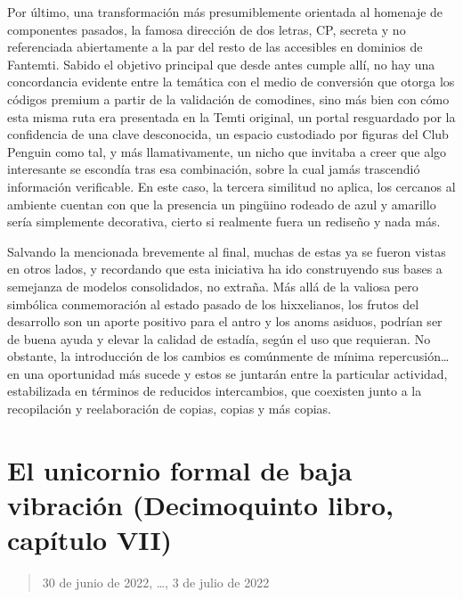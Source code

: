 \documentclass[
]{book}
\begin{document}
Por último, una transformación más presumiblemente orientada al homenaje de componentes pasados, la famosa dirección de dos letras, CP, secreta y no referenciada abiertamente a la par del resto de las accesibles en dominios de Fantemti. Sabido el objetivo principal que desde antes cumple allí, no hay una concordancia evidente entre la temática con el medio de conversión que otorga los códigos premium a partir de la validación de comodines, sino más bien con cómo esta misma ruta era presentada en la Temti original, un portal resguardado por la confidencia de una clave desconocida, un espacio custodiado por figuras del Club Penguin como tal, y más llamativamente, un nicho que invitaba a creer que algo interesante se escondía tras esa combinación, sobre la cual jamás trascendió información verificable. En este caso, la tercera similitud no aplica, los cercanos al ambiente cuentan con que la presencia un pingüino rodeado de azul y amarillo sería simplemente decorativa, cierto si realmente fuera un rediseño y nada más.

Salvando la mencionada brevemente al final, muchas de estas ya se fueron vistas en otros lados, y recordando que esta iniciativa ha ido construyendo sus bases a semejanza de modelos consolidados, no extraña. Más allá de la valiosa pero simbólica conmemoración al estado pasado de los hixxelianos, los frutos del desarrollo son un aporte positivo para el antro y los anoms asiduos, podrían ser de buena ayuda y elevar la calidad de estadía, según el uso que requieran. No obstante, la introducción de los cambios es comúnmente de mínima repercusión\ldots{} en una oportunidad más sucede y estos se juntarán entre la particular actividad, estabilizada en términos de reducidos intercambios, que coexisten junto a la recopilación y reelaboración de copias, copias y más copias.

\hypertarget{el-unicornio-formal-de-baja-vibraciuxf3n-decimoquinto-libro-capuxedtulo-vii}{%
\section{El unicornio formal de baja vibración (Decimoquinto libro, capítulo VII)}\label{el-unicornio-formal-de-baja-vibraciuxf3n-decimoquinto-libro-capuxedtulo-vii}}

\begin{quote}
30 de junio de 2022, \ldots, 3 de julio de 2022
\end{quote}
\end{document}
